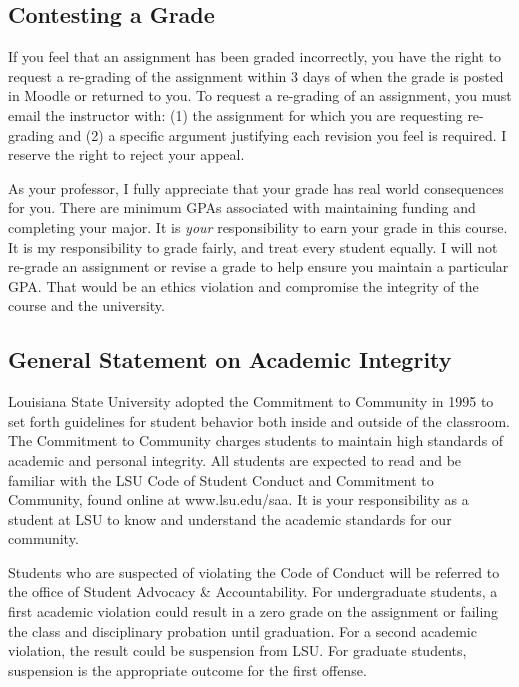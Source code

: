 \documentclass[11pt]{article}
\begin{document}
\subsection*{Contesting a Grade}
\footnotesize{
If you feel that an assignment has been graded incorrectly, you have the right to request a re-grading of the assignment within 3 days of when the grade is posted in Moodle or returned to you.
To request a re-grading of an assignment, you must email the instructor with:
(1) the assignment for which you are requesting re-grading and
(2) a specific argument justifying each revision you feel is required.
I reserve the right to reject your appeal.

As your professor, I fully appreciate that your grade has real world consequences for you.
There are minimum GPAs associated with maintaining funding and completing your major.
It is \emph{your} responsibility to earn your grade in this course.
It is my responsibility to grade fairly, and treat every student equally.
I will not re-grade an assignment or revise a grade to help ensure you maintain a particular GPA.
That would be an ethics violation and compromise the integrity of the course and the university.
}

\subsection*{General Statement on Academic Integrity}
\footnotesize{
	Louisiana State University adopted the Commitment to Community in 1995 to set forth guidelines for student behavior both inside and outside of the classroom.  The Commitment to Community charges students to maintain high standards of academic and personal integrity.  All students are expected to read and be familiar with the LSU Code of Student Conduct and Commitment to Community, found online at www.lsu.edu/saa.  It is your responsibility as a student at LSU to know and understand the academic standards for our community. 
	
	Students who are suspected of violating the Code of Conduct will be referred to the office of Student Advocacy \& Accountability.  For undergraduate students, a first academic violation could result in a zero grade on the assignment or failing the class and disciplinary probation until graduation.  For a second academic violation, the result could be suspension from LSU.  For graduate students, suspension is the appropriate outcome for the first offense.}
\end{document}
